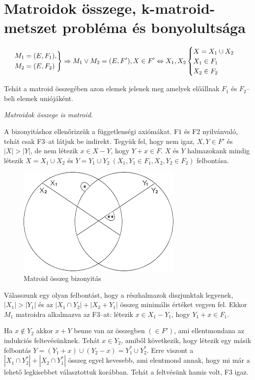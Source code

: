 \section{Matroidok összege, k-matroid-metszet probléma és bonyolultsága}

\[
	\begin{rcases}
		M_1=(E,F_1), \\
		M_2=(E,F_2)
	\end{rcases}
	\Rightarrow
	M_1 \vee M_2  = (E,F'), X \in F' \Leftrightarrow X_1, X_2
	\begin{cases}
		X=X_1 \cup X_2 \\
		X_1 \in F_1    \\
		X_2 \in F_2
	\end{cases}
\]

Tehát a matroid összegében azon elemek jelenek meg amelyek előállnak $F_1$ és
$F_2$--beli elemek uniójáként.

\vspace{0.4cm}
\emph{Matroidok összege is matroid.}
\vspace{0.4cm}

A bizonyitáshoz ellenőrizzük a függetlenségi axiómákat. F$1$ és F$2$
nyilvánvaló, tehát csak F$3$--at látjuk be indirekt. Tegyük fel, hogy nem igaz, $X,Y \in F'$
és $|X|>|Y|$, de nem létezik $x \in X-Y$, hogy $Y+x \in F$. $X$ és $Y$
halmazokank mindig létezik $X=X_1 \cup X_2$ és $Y=Y_1
	\cup Y_2 ~(X_1, Y_1 \in F_1, X_2, Y_2 \in F_2)$ felbontása.

\begin{figure}[htbp]
	\centering
	\includegraphics[width=0.4\linewidth]{./kepek/matroidosszeg.png}
	\caption{Matroid összeg bizonyitás}\label{fig:Unif}
\end{figure}

Válasszunk egy olyan felbontást, hogy a részhalmazok diszjunktak legyenek,
$|X_1|>|Y_1|$ és az $|X_1 \cap Y_2|+|X_2+Y_1|$ összeg minimális értéket vegyen
fel. Ekkor $M_1$ matroidra alkalmazva az F$3$--at: létezik $x \in X_1-Y_1$,
hogy $Y_1+x \in F_1$.

Ha $x \not \in Y_2$ akkor $x+Y $ benne van az összegben $(\in F')$, ami
ellentmondana az indukciós feltevésünknek. Tehát $x \in Y_2$, amiből következik,
hogy létezik egy másik felbontás $Y=(Y_1+x) \cup (Y_2 -x)=Y_1^* \cup Y_2^*$.
Erre viszont a $|X_1\cap Y_2^*|+|X_2 \cap Y_1^*|$ összeg egyel kevesebb, ami
elentmond annak, hogy mi már a lehető legkisebbet választottuk korábban. Tehát a
feltvésünk hamis volt, F$3$ igaz.


